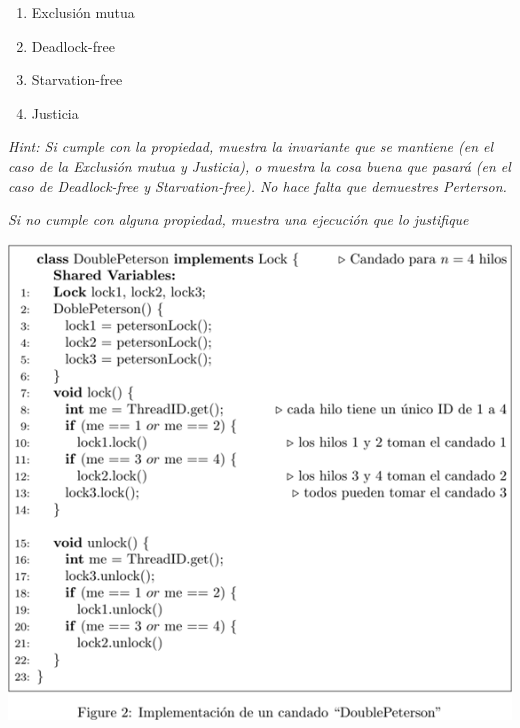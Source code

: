 \begin{enumerate}
    \begin{enumerate}
        \item Exclusión mutua

        \item Deadlock-free

        \item Starvation-free
        
        \item Justicia
    \end{enumerate}

    \textit{Hint: Si cumple con la propiedad, muestra la invariante que se mantiene (en el caso de la Exclusión mutua y Justicia), o muestra la cosa buena que pasará (en el caso de Deadlock-free y Starvation-free). No hace falta que demuestres Perterson.}
    
    \textit{Si no cumple con alguna propiedad, muestra una ejecución que lo justifique}

    \begin{center}
            \includegraphics[width = 12 cm]{Images/Figure2_tarea2.png}
    \end{center}
    
\end{enumerate}
